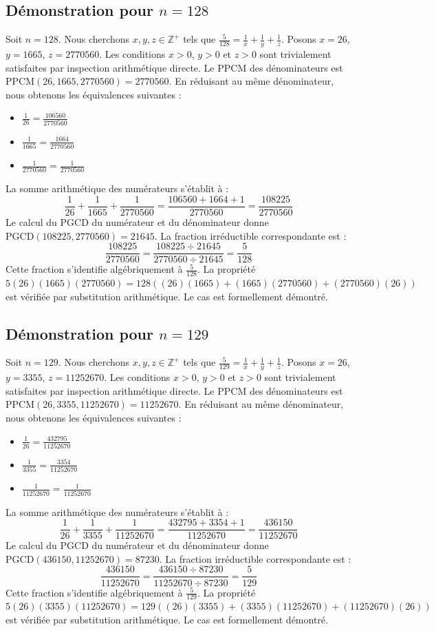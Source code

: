 \documentclass[12pt,a4paper]{article}
\begin{document}
\subsection{Démonstration pour $n = 128$}
Soit $n = 128$. Nous cherchons $x, y, z \in \mathbb{Z}^{+}$ tels que $\frac{5}{128} = \frac{1}{x} + \frac{1}{y} + \frac{1}{z}$.
Posons $x = 26$, $y = 1665$, $z = 2770560$.
Les conditions $x > 0$, $y > 0$ et $z > 0$ sont trivialement satisfaites par inspection arithmétique directe.
Le PPCM des dénominateurs est $\text{PPCM}(26, 1665, 2770560) = 2770560$.
En réduisant au même dénominateur, nous obtenons les équivalences suivantes :
\begin{itemize}
    \item $\frac{1}{26} = \frac{106560}{2770560}$
    \item $\frac{1}{1665} = \frac{1664}{2770560}$
    \item $\frac{1}{2770560} = \frac{1}{2770560}$
\end{itemize}
La somme arithmétique des numérateurs s'établit à :
$$ \frac{1}{26} + \frac{1}{1665} + \frac{1}{2770560} = \frac{106560 + 1664 + 1}{2770560} = \frac{108225}{2770560} $$
Le calcul du PGCD du numérateur et du dénominateur donne $\text{PGCD}(108225, 2770560) = 21645$.
La fraction irréductible correspondante est :
$$ \frac{108225}{2770560} = \frac{108225 \div 21645}{2770560 \div 21645} = \frac{5}{128} $$
Cette fraction s'identifie algébriquement à $\frac{5}{128}$.
La propriété $5(26)(1665)(2770560) = 128((26)(1665) + (1665)(2770560) + (2770560)(26))$ est vérifiée par substitution arithmétique.
Le cas est formellement démontré.

\subsection{Démonstration pour $n = 129$}
Soit $n = 129$. Nous cherchons $x, y, z \in \mathbb{Z}^{+}$ tels que $\frac{5}{129} = \frac{1}{x} + \frac{1}{y} + \frac{1}{z}$.
Posons $x = 26$, $y = 3355$, $z = 11252670$.
Les conditions $x > 0$, $y > 0$ et $z > 0$ sont trivialement satisfaites par inspection arithmétique directe.
Le PPCM des dénominateurs est $\text{PPCM}(26, 3355, 11252670) = 11252670$.
En réduisant au même dénominateur, nous obtenons les équivalences suivantes :
\begin{itemize}
    \item $\frac{1}{26} = \frac{432795}{11252670}$
    \item $\frac{1}{3355} = \frac{3354}{11252670}$
    \item $\frac{1}{11252670} = \frac{1}{11252670}$
\end{itemize}
La somme arithmétique des numérateurs s'établit à :
$$ \frac{1}{26} + \frac{1}{3355} + \frac{1}{11252670} = \frac{432795 + 3354 + 1}{11252670} = \frac{436150}{11252670} $$
Le calcul du PGCD du numérateur et du dénominateur donne $\text{PGCD}(436150, 11252670) = 87230$.
La fraction irréductible correspondante est :
$$ \frac{436150}{11252670} = \frac{436150 \div 87230}{11252670 \div 87230} = \frac{5}{129} $$
Cette fraction s'identifie algébriquement à $\frac{5}{129}$.
La propriété $5(26)(3355)(11252670) = 129((26)(3355) + (3355)(11252670) + (11252670)(26))$ est vérifiée par substitution arithmétique.
Le cas est formellement démontré.
\end{document}
